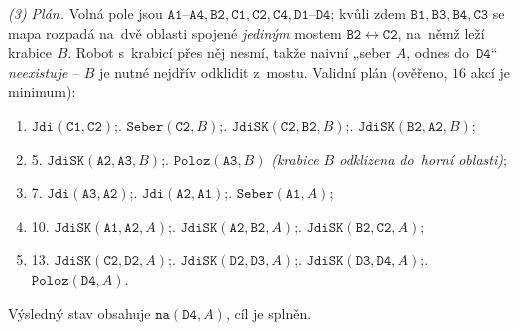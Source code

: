 \noindent\emph{(3) Plán.} Volná pole jsou $\mathtt{A1\text{--}A4},\mathtt{B2},\mathtt{C1},\mathtt{C2},\mathtt{C4},\mathtt{D1\text{--}D4}$; kvůli zdem $\mathtt{B1,B3,B4,C3}$ se mapa rozpadá na~dvě oblasti spojené \emph{jediným} mostem $\mathtt{B2}\!\leftrightarrow\!\mathtt{C2}$, na~němž leží krabice $B$. Robot s~krabicí přes něj nesmí, takže naivní „seber $A$, odnes do~$\mathtt{D4}$`` \emph{neexistuje} -- $B$ je nutné nejdřív odklidit z~mostu. Validní plán (ověřeno, $16$ akcí je minimum):
\begin{enumerate}[nosep]
  \item $\mathtt{Jdi}(\mathtt{C1,C2})$;. $\mathtt{Seber}(\mathtt{C2},B)$;. $\mathtt{JdiSK}(\mathtt{C2,B2},B)$;. $\mathtt{JdiSK}(\mathtt{B2,A2},B)$;
  \item[] 5. $\mathtt{JdiSK}(\mathtt{A2,A3},B)$;. $\mathtt{Poloz}(\mathtt{A3},B)$ \emph{(krabice $B$ odklizena do~horní oblasti)};
  \item[] 7. $\mathtt{Jdi}(\mathtt{A3,A2})$;. $\mathtt{Jdi}(\mathtt{A2,A1})$;. $\mathtt{Seber}(\mathtt{A1},A)$;
  \item[] 10. $\mathtt{JdiSK}(\mathtt{A1,A2},A)$;. $\mathtt{JdiSK}(\mathtt{A2,B2},A)$;. $\mathtt{JdiSK}(\mathtt{B2,C2},A)$;
  \item[] 13. $\mathtt{JdiSK}(\mathtt{C2,D2},A)$;. $\mathtt{JdiSK}(\mathtt{D2,D3},A)$;. $\mathtt{JdiSK}(\mathtt{D3,D4},A)$;. $\mathtt{Poloz}(\mathtt{D4},A)$.
\end{enumerate}
Výsledný stav obsahuje $\mathtt{na}(\mathtt{D4},A)$, cíl je splněn.
